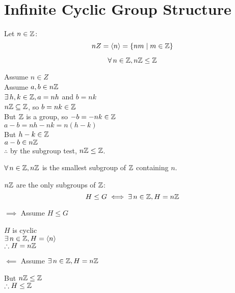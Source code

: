 \documentclass[letterpaper,12pt,fleqn]{article}
\newcommand{\cycle}[1]{\left<#1\right>}
\begin{document}
\section*{Infinite Cyclic Group Structure}

\begin{definition}
  Let $n\in\mathbb{Z}$:
  \[nZ=\cycle{n}=\{nm\mid m\in\Z\}\]
\end{definition}

\begin{theorem}
  \listbreak
  \[\forall\,n\in\mathbb{Z},n\mathbb{Z}\le\mathbb{Z}\]
\end{theorem}

\begin{theproof}
  Assume $n\in Z$ \\
  Assume $a,b\in n\mathbb{Z}$ \\
  $\exists\,h,k\in\mathbb{Z},a=nh$ and $b=nk$ \\
  $n\mathbb{Z}\subseteq\mathbb{Z}$, so $b=nk\in\mathbb{Z}$ \\
  But $\mathbb{Z}$ is a group, so $-b=-nk\in\mathbb{Z}$ \\
  $a-b=nh-nk=n(h-k)$ \\
  But $h-k\in\mathbb{Z}$ \\
  $a-b\in n\mathbb{Z}$ \\
  $\therefore$ by the subgroup test, $n\mathbb{Z}\le\mathbb{Z}$.
\end{theproof}

\begin{corollary}
  $\forall\,n\in\mathbb{Z},n\mathbb{Z}$ is the smallest subgroup of $\mathbb{Z}$ containing $n$.
\end{corollary}

\begin{corollary}
  $n\mathbb{Z}$ are the only subgroups of $\mathbb{Z}$:
  \[H\le G\iff\exists\,n\in\mathbb{Z},H=n\mathbb{Z}\]
\end{corollary}

\begin{theproof}
  \listbreak
  \begin{description}
    \begin{minipage}[t]{2.5in}
    \item $\implies$ Assume $H\le G$
      
      $H$ is cyclic \\
      $\exists\,n\in\Z,H=\cycle{n}$ \\
      $\therefore H=n\mathbb{Z}$
    \end{minipage}
    \begin{minipage}[t]{2.5in}
    \item $\impliedby$ Assume $\exists\,n\in\mathbb{Z},H=n\mathbb{Z}$

      But $n\mathbb{Z}\le\mathbb{Z}$ \\
      $\therefore H\le\mathbb{Z}$
    \end{minipage}
  \end{description}
\end{theproof}
\end{document}
